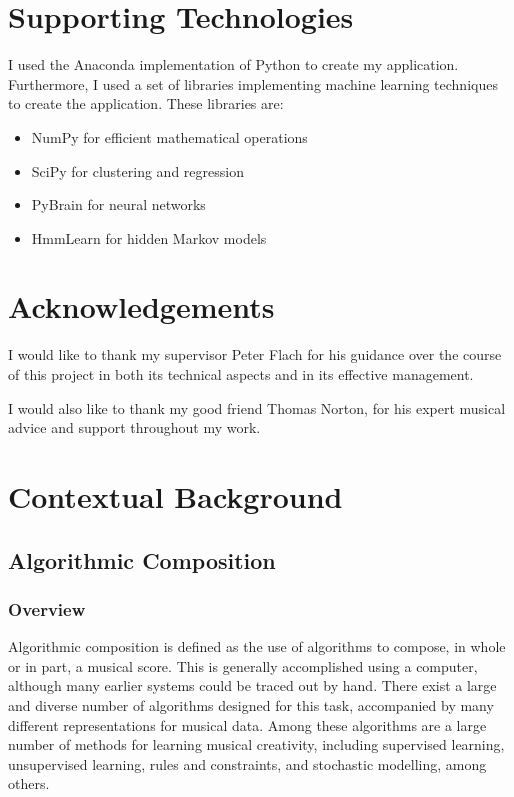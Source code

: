 \documentclass[ author={Stephen Livermore-Tozer},
				supervisor={Dr. Peter Flach},
				degree={MEng},
				title={Performing Algorithmic Co-composition Using Machine Learning},
				subtitle={},
				type={research},
				year={2016} ]{dissertation}
\begin{document}
	\chapter*{Supporting Technologies}
	
	I used the Anaconda implementation of Python to create my application. Furthermore, I used a set of libraries implementing machine learning techniques to create the application. These libraries are:
	
	\begin{itemize}
		\item NumPy for efficient mathematical operations
		\item SciPy for clustering and regression
		\item PyBrain for neural networks
		\item HmmLearn for hidden Markov models
	\end{itemize}
	
	
	\chapter*{Acknowledgements}
	
	I would like to thank my supervisor Peter Flach for his guidance over the course of this project in both its technical aspects and in its effective management.
	
	I would also like to thank my good friend Thomas Norton, for his expert musical advice and support throughout my work.
	
	\mainmatter
	
	
	\chapter{Contextual Background}
	\label{chap:context}
	
	\section{Algorithmic Composition}

	\subsection{Overview}
	
	Algorithmic composition is defined as the use of algorithms to compose, in whole or in part, a musical score. This is generally accomplished using a computer, although many earlier systems could be traced out by hand. There exist a large and diverse number of algorithms designed for this task, accompanied by many different representations for musical data. Among these algorithms are a large number of methods for learning musical creativity, including supervised learning, unsupervised learning, rules and constraints, and stochastic modelling, among others.
	
\end{document}
